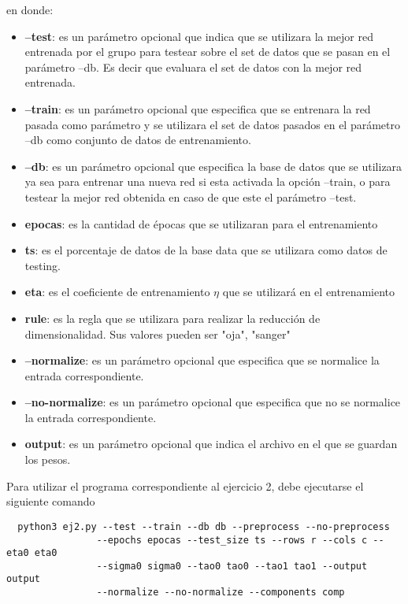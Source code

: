 en donde:
\begin{itemize}
  \item \textbf{--test}: es un parámetro opcional que indica que se utilizara la mejor red entrenada por el grupo para testear sobre el set de datos que se pasan en el parámetro
  --db. Es decir que evaluara el set de datos con la mejor red entrenada.
  \item \textbf{--train}: es un parámetro opcional que especifica que se entrenara la red pasada como parámetro y se utilizara el set de datos pasados en el parámetro --db
  como conjunto de datos de entrenamiento.
  \item \textbf{--db}: es un parámetro opcional que especifica la base de datos que se utilizara ya sea para entrenar una nueva red si esta activada la opción --train, o
  para testear la mejor red obtenida en caso de que este el parámetro --test.
  \item \textbf{epocas}: es la cantidad de épocas que se utilizaran para el entrenamiento
  \item \textbf{ts}: es el porcentaje de datos de la base data que se utilizara como datos de testing.
  \item \textbf{eta}: es el coeficiente de entrenamiento $\eta$ que se utilizará en el entrenamiento
  \item \textbf{rule}: es la regla que se utilizara para realizar la reducción de dimensionalidad. Sus valores pueden ser {"oja", "sanger"}
  \item \textbf{--normalize}: es un parámetro opcional que especifica que se normalice la entrada correspondiente.
  \item \textbf{--no-normalize}: es un parámetro opcional que especifica que no se normalice la entrada correspondiente.
  \item \textbf{output}: es un parámetro opcional que indica el archivo en el que se guardan los pesos.
\end{itemize}

Para utilizar el programa correspondiente al ejercicio 2, debe ejecutarse el siguiente comando
\begin{verbatim}
  python3 ej2.py --test --train --db db --preprocess --no-preprocess
                --epochs epocas --test_size ts --rows r --cols c --eta0 eta0
                --sigma0 sigma0 --tao0 tao0 --tao1 tao1 --output output
                --normalize --no-normalize --components comp
\end{verbatim}


